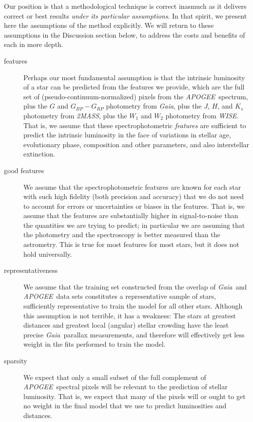 \documentclass[modern]{aastex62}
\newcommand{\acronym}[1]{{\small{#1}}}
\newcommand{\project}[1]{\textsl{#1}}
\newcommand{\apogee}{\project{\acronym{APOGEE}}}
\newcommand{\gaia}{\project{Gaia}}
\newcommand{\wise}{\project{\acronym{WISE}}}
\newcommand{\zmass}{\project{\acronym{2MASS}}}
\begin{document}
Our position is that a methodological technique is correct inasmuch as
it delivers correct or best results \emph{under its particular assumptions}.
In that spirit, we present here the assumptions of the method
explicitly.
We will return to these assumptions in the Discussion section below,
to address the costs and benefits of each in more depth.
\begin{description}
\item[features] Perhaps our most fundamental assumption is that the intrinsic
luminosity of a star can be predicted from the features we provide, which are
the full set of (pseudo-continuum-normalized) pixels from the \apogee\ spectrum,
plus the $G$ and $G_{BP}-G_{RP}$ photometry from \gaia,
plus the $J$, $H$, and $K_s$ photometry from \zmass,
plus the $W_1$ and $W_2$ photometry from \wise.
That is, we assume that these spectrophotometric \emph{features} are sufficient
to predict the intrinsic luminosity in the face of variations in stellar
age, evolutionary phase, composition and other parameters, and also interstellar
extinction.

\item[good features] We assume that the spectrophotometric features are known for
each star with such high fidelity (both precision and accuracy) that we do not
need to account for errors or uncertainties or biases in the features.
That is, we assume that the features are substantially higher in signal-to-noise than the
quantities we are trying to predict; in particular we are assuming that the photometry
and the spectroscopy is better measured than the astrometry.
This is true for most features for most stars, but it does not hold universally.

\item[representativeness] We assume that the training set constructed from the overlap
of \gaia\ and \apogee\ data sets constitutes a representative sample of stars,
sufficiently representative to train the model for all other stars.
Although this assumption is not terrible, it has a weakness:
The stars at greatest distances and greatest local (angular) stellar crowding have
the least precise \gaia\ parallax measurements, and therefore will effectively get
less weight in the fits performed to train the model.

\item[sparsity] We expect that only a small subset of the full complement of
\apogee\ spectral pixels will be relevant to the prediction of stellar luminosity.
That is, we expect that many of the pixels will or ought to get no weight in the
final model that we use to predict luminosities and distances.


\end{description}
\end{document}
